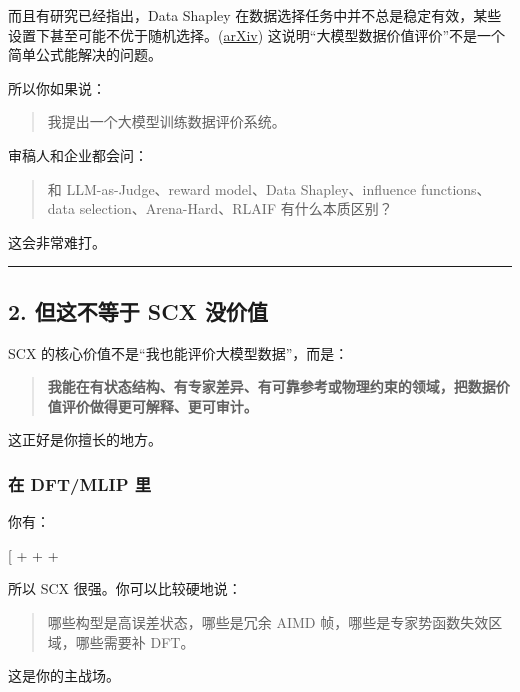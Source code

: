 \documentclass[
  12pt,
]{ctexart}
\begin{document}
而且有研究已经指出，Data Shapley
在数据选择任务中并不总是稳定有效，某些设置下甚至可能不优于随机选择。(\href{https://arxiv.org/abs/2501.07314?utm_source=chatgpt.com}{arXiv})
这说明``大模型数据价值评价''不是一个简单公式能解决的问题。

所以你如果说：

\begin{quote}
我提出一个大模型训练数据评价系统。
\end{quote}

审稿人和企业都会问：

\begin{quote}
和 LLM-as-Judge、reward model、Data Shapley、influence functions、data
selection、Arena-Hard、RLAIF 有什么本质区别？
\end{quote}

这会非常难打。

\begin{center}\rule{0.5\linewidth}{0.5pt}\end{center}

\subsection{2. 但这不等于 SCX
没价值}\label{ux4f46ux8fd9ux4e0dux7b49ux4e8e-scx-ux6ca1ux4ef7ux503c}

SCX 的核心价值不是``我也能评价大模型数据''，而是：

\begin{quote}
\textbf{我能在有状态结构、有专家差异、有可靠参考或物理约束的领域，把数据价值评价做得更可解释、更可审计。}
\end{quote}

这正好是你擅长的地方。

\subsubsection{在 DFT/MLIP 里}\label{ux5728-dftmlip-ux91cc}

你有：

{[}  +  +
 + \text{expert potential}{]}

所以 SCX 很强。你可以比较硬地说：

\begin{quote}
哪些构型是高误差状态，哪些是冗余 AIMD
帧，哪些是专家势函数失效区域，哪些需要补 DFT。
\end{quote}

这是你的主战场。
\end{document}
